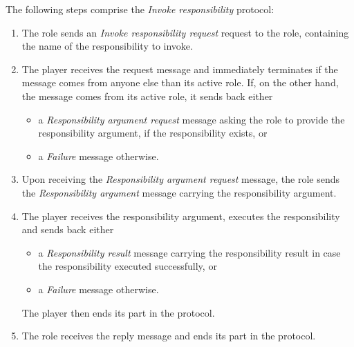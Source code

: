The following steps comprise the \textit{Invoke responsibility} protocol:
\begin{enumerate}
	\item The role sends an \textit{Invoke responsibility request} request to the role, containing the name of the responsibility to invoke.
	\item The player receives the request message and immediately terminates if the message comes from anyone else than its active role.
	If, on the other hand, the message comes from its active role, it sends back either
	\begin{itemize}
		\item a \textit{Responsibility argument request} message asking the role to provide the responsibility argument, if the responsibility exists, or
		\item a \textit{Failure} message otherwise.
	\end{itemize}
	\item Upon receiving the \textit{Responsibility argument request} message, the role sends the \textit{Responsibility argument} message carrying the responsibility argument.
	\item The player receives the responsibility argument, executes the responsibility and sends back either
	\begin{itemize}
		\item a \textit{Responsibility result} message carrying the responsibility result in case the responsibility executed successfully, or
		\item a \textit{Failure} message otherwise.
	\end{itemize}
	The player then ends its part in the protocol.
	\item The role receives the reply message and ends its part in the protocol.
\end{enumerate}